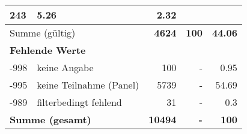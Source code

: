 \begin{longtable}{lXrrr}
       \num{243} &
       \num[round-mode=places,round-precision=2]{5.26} &
         \num[round-mode=places,round-precision=2]{2.32} \\
     \midrule
     \multicolumn{2}{l}{Summe (gültig)} &
       \textbf{\num{4624}} &
     \textbf{\num{100}} &
       \textbf{\num[round-mode=places,round-precision=2]{44.06}} \\
     \multicolumn{5}{l}{\textbf{Fehlende Werte}}\\
       -998 &
       keine Angabe &
         \num{100} &
        - &
         \num[round-mode=places,round-precision=2]{0.95} \\
       -995 &
       keine Teilnahme (Panel) &
         \num{5739} &
        - &
         \num[round-mode=places,round-precision=2]{54.69} \\
       -989 &
       filterbedingt fehlend &
         \num{31} &
        - &
         \num[round-mode=places,round-precision=2]{0.3} \\
     \midrule
     \multicolumn{2}{l}{\textbf{Summe (gesamt)}} &
          \textbf{\num{10494}} &
        \textbf{-} &
        \textbf{\num{100}} \\
     \bottomrule
     \end{longtable}
     
